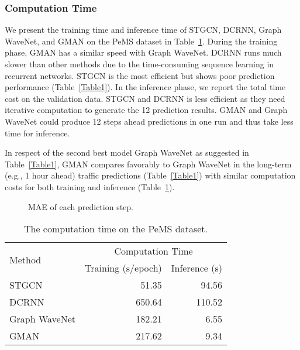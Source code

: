 \documentclass[letterpaper]{article} \usepackage{aaai20}  \usepackage{times}  \usepackage{helvet} \usepackage{courier}  \usepackage[hyphens]{url}  \usepackage{graphicx} \usepackage{amsmath}
\begin{document}
\subsubsection{Computation Time}

We present the training time and inference time of STGCN, DCRNN, Graph WaveNet, and GMAN on the PeMS dataset in Table~\ref{Table2}. During the training phase, GMAN has a similar speed with Graph WaveNet. DCRNN runs much slower than other methods due to the time-consuming sequence learning in recurrent networks. STGCN is the most efficient but shows poor prediction performance (Table~\ref{Table1}). In the inference phase, we report the total time cost on the validation data. STGCN and DCRNN is less efficient as they need iterative computation to generate the 12 prediction results. GMAN and Graph WaveNet could produce 12 steps ahead predictions in one run and thus take less time for inference. 

In respect of the second best model Graph WaveNet as suggested in Table~\ref{Table1}, GMAN compares favorably to Graph WaveNet in the long-term (e.g., 1 hour ahead) traffic predictions (Table~\ref{Table1}) with similar computation costs for both training and inference (Table~\ref{Table2}). 

\begin{figure}
	\centering
	\caption{MAE of each prediction step.}
	\label{Figure9} 
\end{figure}

\begin{table}
	\centering
	\begin{tabular*}{\hsize}{@{}@{\extracolsep{\fill}}lrr@{}}
		\toprule
		\multirow{2}{*}{Method}		& \multicolumn{2}{c}{Computation Time}		\\
		& Training (s/epoch)	& Inference (s)		\\
		\midrule
		STGCN						& 51.35					& 94.56 			\\
		DCRNN						& 650.64				& 110.52			\\
		Graph WaveNet				& 182.21				& 6.55				\\
		GMAN                        & 217.62                & 9.34              \\
		\bottomrule
	\end{tabular*}
	\caption{The computation time on the PeMS dataset.}
	\label{Table2}
\end{table}
\end{document}
